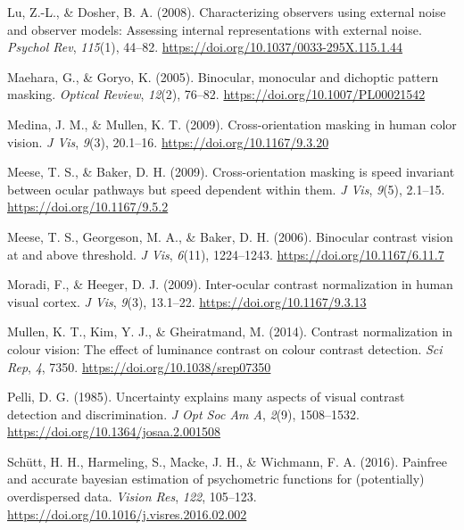 \documentclass[
]{article}
\newlength{\cslhangindent}
\newlength{\cslentryspacingunit} %
\newenvironment{CSLReferences}[2] %
 {%
  \setlength{\parindent}{0pt}
  \ifodd #1
  \let\oldpar\par
  \def\par{\hangindent=\cslhangindent\oldpar}
  \fi
  \setlength{\parskip}{#2\cslentryspacingunit}
 }%
 {}
\begin{document}
\begin{CSLReferences}{1}{0}
\leavevmode{}%
Lu, Z.-L., \& Dosher, B. A. (2008). Characterizing observers using external noise and observer models: Assessing internal representations with external noise. \emph{Psychol Rev}, \emph{115}(1), 44--82. \url{https://doi.org/10.1037/0033-295X.115.1.44}

\leavevmode{}%
Maehara, G., \& Goryo, K. (2005). Binocular, monocular and dichoptic pattern masking. \emph{Optical Review}, \emph{12}(2), 76--82. \url{https://doi.org/10.1007/PL00021542}

\leavevmode{}%
Medina, J. M., \& Mullen, K. T. (2009). Cross-orientation masking in human color vision. \emph{J Vis}, \emph{9}(3), 20.1--16. \url{https://doi.org/10.1167/9.3.20}

\leavevmode{}%
Meese, T. S., \& Baker, D. H. (2009). Cross-orientation masking is speed invariant between ocular pathways but speed dependent within them. \emph{J Vis}, \emph{9}(5), 2.1--15. \url{https://doi.org/10.1167/9.5.2}

\leavevmode{}%
Meese, T. S., Georgeson, M. A., \& Baker, D. H. (2006). Binocular contrast vision at and above threshold. \emph{J Vis}, \emph{6}(11), 1224--1243. \url{https://doi.org/10.1167/6.11.7}

\leavevmode{}%
Moradi, F., \& Heeger, D. J. (2009). Inter-ocular contrast normalization in human visual cortex. \emph{J Vis}, \emph{9}(3), 13.1--22. \url{https://doi.org/10.1167/9.3.13}

\leavevmode{}%
Mullen, K. T., Kim, Y. J., \& Gheiratmand, M. (2014). Contrast normalization in colour vision: The effect of luminance contrast on colour contrast detection. \emph{Sci Rep}, \emph{4}, 7350. \url{https://doi.org/10.1038/srep07350}

\leavevmode{}%
Pelli, D. G. (1985). Uncertainty explains many aspects of visual contrast detection and discrimination. \emph{J Opt Soc Am A}, \emph{2}(9), 1508--1532. \url{https://doi.org/10.1364/josaa.2.001508}

\leavevmode{}%
Schütt, H. H., Harmeling, S., Macke, J. H., \& Wichmann, F. A. (2016). Painfree and accurate bayesian estimation of psychometric functions for (potentially) overdispersed data. \emph{Vision Res}, \emph{122}, 105--123. \url{https://doi.org/10.1016/j.visres.2016.02.002}


\end{CSLReferences}
\end{document}
